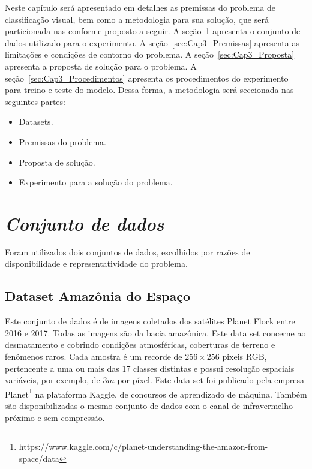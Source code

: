 
Neste capítulo será apresentado em detalhes as premissas do problema de classificação visual, bem como a metodologia para sua solução, que será particionada nas conforme proposto a seguir. A seção~\ref{sec:Cap3_Dataset} apresenta o conjunto de dados utilizado para o experimento.  A seção~\ref{sec:Cap3_Premissas} apresenta as limitações e condições de contorno do problema. A seção~\ref{sec:Cap3_Proposta} apresenta a proposta de solução para o problema. A seção~\ref{sec:Cap3_Procedimentos} apresenta os procedimentos do experimento para treino e teste do modelo. Dessa forma, a metodologia será seccionada nas seguintes partes:

\begin{itemize}
    \item  Datasets.
    \item  Premissas do problema.
    \item  Proposta de solução.
    \item  Experimento para a solução do problema.

\end{itemize}


\section{\textit{Conjunto de dados}}\label{sec:Cap3_Dataset}
Foram utilizados dois conjuntos de dados, escolhidos por razões de disponibilidade e representatividade do problema. 


\subsection{Dataset Amazônia do Espaço}\label{sec:Cap3_Amazon_dataset}

Este conjunto de dados é de imagens coletados dos satélites Planet Flock entre 2016 e 2017. Todas as imagens são da bacia amazônica. Este data set concerne ao desmatamento e cobrindo condições atmosféricas, coberturas de terreno e fenômenos raros. Cada amostra é um recorde de $256 \times 256$ pixeis RGB, pertencente a uma ou mais das 17 classes distintas e possui resolução espaciais variáveis, por exemplo, de $3 m$ por píxel. Este data set foi publicado pela empresa Planet\footnote{https://www.kaggle.com/c/planet-understanding-the-amazon-from-space/data} na plataforma Kaggle, de concursos de aprendizado de máquina. Também são disponibilizadas o mesmo conjunto de dados com o canal de infravermelho-próximo e sem compressão.

